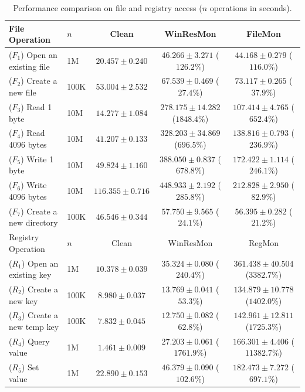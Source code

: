 \begin{table}
\centering
\begin{tabular}{|l|l|c|c|c|}
\hline
File Operation & $n$ & Clean & WinResMon & FileMon \\
\hline
($F_1$) Open an existing file  & 1M   & $20.457 \pm 0.240$  & $46.266 \pm 3.271$ ($126.2\%$)    & $44.168 \pm 0.279$ ($116.0\%$)\\
($F_2$) Create a new file      & 100K & $53.004 \pm 2.532$  & $67.539 \pm 0.469$ ($27.4\%$)     & $73.117 \pm 0.265$ ($37.9\%$) \\
($F_3$) Read 1 byte            & 10M  & $14.277 \pm 1.084$  & $278.175 \pm 14.282$ ($1848.4\%$) & $107.414 \pm 4.765$ ($652.4\%$) \\
($F_4$) Read 4096 bytes        & 10M  & $41.207 \pm 0.133$  & $328.203 \pm 34.869$ ($696.5\%$)  & $138.816 \pm 0.793$ ($236.9\%$) \\
($F_5$) Write 1 byte           & 10M  & $49.824 \pm 1.160$  & $388.050 \pm 0.837$ ($678.8\%$)   & $172.422 \pm 1.114$ ($246.1\%$) \\
($F_6$) Write 4096 bytes       & 10M  & $116.355 \pm 0.716$ & $448.933 \pm 2.192$ ($285.8\%$)   & $212.828 \pm 2.950$ ($82.9\%$) \\
($F_7$) Create a new directory & 100K & $46.546 \pm 0.344$  & $57.750 \pm 9.565$ ($24.1\%$)     & $56.395 \pm 0.282$ ($21.2\%$) \\
\hline
\hline
Registry Operation & $n$ & Clean & WinResMon & RegMon \\
\hline
($R_1$) Open an existing key  & 1M   & $10.378 \pm 0.039$ & $35.324 \pm 0.080$ ($240.4\%$)  & $361.438 \pm 40.504$ ($3382.7\%$) \\
($R_2$) Create a new key      & 100K & $8.980 \pm 0.037$  & $13.769 \pm 0.041$ ($53.3\%$)   & $134.879 \pm 10.778$ ($1402.0\%$) \\
($R_3$) Create a new temp key & 100K & $7.832 \pm 0.045$  & $12.750 \pm 0.082$ ($62.8\%$)   & $142.961 \pm 12.811$ ($1725.3\%$) \\
($R_4$) Query value           & 1M   & $1.461 \pm 0.009$  & $27.203 \pm 0.061$ ($1761.9\%$) & $166.301 \pm 4.406$ ($11382.7\%$) \\
($R_5$) Set value             & 1M   & $22.890 \pm 0.153$ & $46.379 \pm 0.090$ ($102.6\%$)  & $182.473 \pm 7.272$ ($697.1\%$) \\
\hline
\end{tabular}
\caption{Performance comparison on file and registry access ($n$ operations in seconds).}
\label{tab:winresmon-perf-fr}
\end{table}


